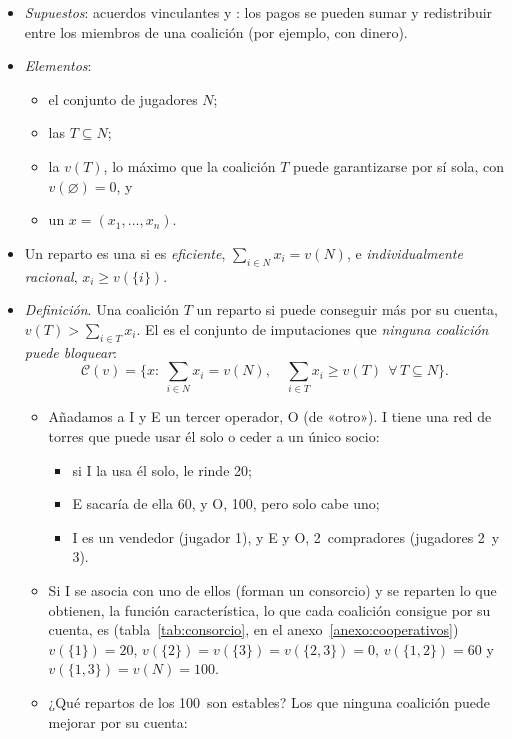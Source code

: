 \documentclass[11pt]{article}
\begin{document}
\begin{itemize}
\item \emph{Supuestos}: acuerdos vinculantes y : los pagos se pueden sumar y redistribuir entre los miembros de una coalición (por ejemplo, con dinero).
\item \emph{Elementos}:
  \begin{itemize}
  \item el conjunto de jugadores $N$;
  \item las  $T\subseteq N$;
  \item la  $v(T)$, lo máximo que la coalición $T$ puede garantizarse por sí sola, con $v(\varnothing)=0$, y
  \item un  $x=(x_1,\dots,x_n)$.
  \end{itemize}
\item Un reparto es una  si es \emph{eficiente}, $\sum_{i\in N}x_i=v(N)$, e \emph{individualmente racional}, $x_i\geq v(\{i\})$.
\item \emph{Definición}\nocite{Gillies1959Solutions}. Una coalición $T$  un reparto si puede conseguir más por su cuenta, $v(T)>\sum_{i\in T}x_i$. El  es el conjunto de imputaciones que \emph{ninguna coalición puede bloquear}:
\[
\mathcal{C}(v)=\Big\{x:\ \sum_{i\in N}x_i=v(N),\quad \sum_{i\in T}x_i\geq v(T)\ \ \forall\,T\subseteq N\Big\}.
\]
  \begin{itemize}
  \item Añadamos a \textup{I} y E un tercer operador, O (de «otro»). \textup{I} tiene una red de torres que puede usar él solo o ceder a un único socio:
    \begin{itemize}
    \item si \textup{I} la usa él solo, le rinde 20;
    \item E sacaría de ella 60, y O, 100, pero solo cabe uno;
    \item \textup{I} es un vendedor (jugador 1), y E y O, 2~compradores (jugadores 2~y 3).
    \end{itemize}
  \item Si \textup{I} se asocia con uno de ellos (forman un consorcio) y se reparten lo que obtienen, la función característica, lo que cada coalición consigue por su cuenta, es (tabla~\ref{tab:consorcio}, en el anexo~\ref{anexo:cooperativos}) $v(\{1\})=20$, $v(\{2\})=v(\{3\})=v(\{2,3\})=0$, $v(\{1,2\})=60$ y $v(\{1,3\})=v(N)=100$.
  \item ¿Qué repartos de los 100~son estables? Los que ninguna coalición puede mejorar por su cuenta:

\end{itemize}
\end{itemize}
\end{document}
